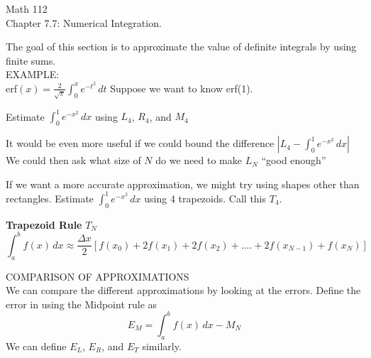 \documentclass[11pt]{article}
\begin{document}
\begin{center}
\Large
\rm{Math 112}
\\
\rm{Chapter 7.7: Numerical Integration.}
\\
\end{center}
\vspace{0.2in}

The goal of this section is to approximate the value of definite integrals by using finite sums.\\


EXAMPLE:\\

erf$(x) = \frac{2}{\sqrt{\pi}}\int_0^xe^{-t^2}\, dt$ \quad  Suppose we want to know erf(1).

\vspace{0.2in}

Estimate $\int_0^1e^{-x^2}\, dx$ using $L_4$, $R_4$, and $M_4$ \\

\vspace{2in}

It would be even more useful if we could bound the difference $\left|L_4-\int_0^1e^{-x^2}\, dx\right|$\\

We could then ask what size of $N$ do we need to make $L_N$ ``good enough''



\pagebreak


If we want a more accurate approximation, we might try using shapes other than rectangles.  Estimate $\int_0^1e^{-x^2}\, dx$ using 4 trapezoids.  Call this $T_4$. \\

\vspace{4in.}


{\bf Trapezoid Rule} $T_N$
\begin{displaymath}
\int_a^bf(x)\,dx \approx  \frac{\Delta x}{2}\left[f(x_0) + 2f(x_1) + 2f(x_2) + .... + 2f(x_{N-1}) + f(x_N)\right]
\end{displaymath}

\vspace{1cm}

COMPARISON OF APPROXIMATIONS \\

We can compare the different approximations by looking at the errors.  Define  the error in using the Midpoint rule as \\
\begin{displaymath}
E_M = \int_a^bf(x) \, dx - M_N
\end{displaymath}
We can define $E_L$, $E_R$, and $E_T$ similarly.
\end{document}
